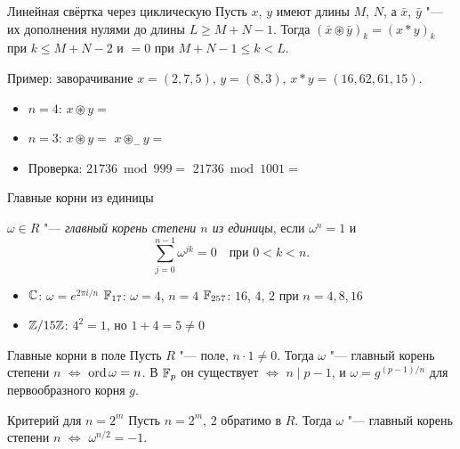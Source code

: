 \documentclass{ca-slides}
\begin{document}
\begin{theoremframe}{Линейная свёртка через циклическую}
  Пусть $x$, $y$ имеют длины $M$, $N$, а $\bar x$, $\bar y$ "--- их дополнения нулями до длины
  $L \ge M + N - 1$. Тогда $(\bar x \circledast \bar y)_k = (x * y)_k$ при $k \le M + N - 2$ и
  $= 0$ при $M + N - 1 \le k < L$.
\end{theoremframe}

\begin{canvasframe}{Пример: заворачивание}
  $x = (2, 7, 5)$, $y = (8, 3)$, $x * y = (16, 62, 61, 15)$.
  \begin{itemize}
    \item $n = 4$: \quad $x \circledast y = {}$
    \item $n = 3$: \quad $x \circledast y = {}$ \qquad\qquad $x \circledast_{-} y = {}$
    \item Проверка: $21736 \bmod 999 = {}$ \qquad $21736 \bmod 1001 = {}$
  \end{itemize}
  \penspace[0.25\textheight]
\end{canvasframe}

\begin{canvasframe}{Главные корни из единицы}
  \begin{definition}
    $\omega \in R$ "--- \emph{главный корень степени $n$ из единицы}, если $\omega^n = 1$ и
    \[ \sum_{j=0}^{n-1} \omega^{jk} = 0 \quad\text{при } 0 < k < n. \]
  \end{definition}
  \begin{itemize}
    \item $\mathbb{C}$: $\omega = e^{2\pi i/n}$ \qquad $\mathbb{F}_{17}$: $\omega = 4$, $n = 4$
      \qquad $\mathbb{F}_{257}$: $16$, $4$, $2$ при $n = 4, 8, 16$
    \item $\mathbb{Z}/15\mathbb{Z}$: $4^2 = 1$, но $1 + 4 = 5 \ne 0$
  \end{itemize}
\end{canvasframe}

\begin{theoremframe}{Главные корни в поле}
  Пусть $R$ "--- поле, $n \cdot 1 \ne 0$. Тогда $\omega$ "--- главный корень степени $n$
  $\iff$ $\operatorname{ord} \omega = n$. В $\mathbb{F}_{p}$ он существует $\iff$ $n \mid p - 1$, и
  $\omega = g^{(p-1)/n}$ для первообразного корня $g$.
\end{theoremframe}

\begin{theoremframe}[lemma]{Критерий для $n = 2^m$}
  Пусть $n = 2^m$, $2$ обратимо в $R$. Тогда $\omega$ "--- главный корень степени $n$
  $\iff$ $\omega^{n/2} = -1$.
\end{theoremframe}
\end{document}
